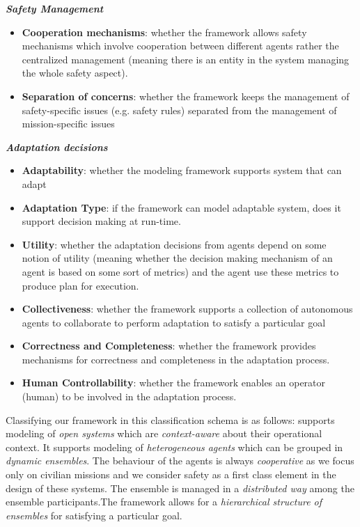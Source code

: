 \documentclass[journal]{IEEEtran}
\theoremstyle{definition}
\begin{document}
\textbf{\textit{Safety Management}}

\begin{itemize}
\item \textbf{Cooperation mechanisms}: whether the framework allows safety mechanisms which involve cooperation between different agents rather the centralized management (meaning there is an entity in the system managing the whole safety aspect).
\item \textbf{Separation of concerns}: whether the framework keeps the management of safety-specific issues (e.g. safety rules)  separated from the management of mission-specific issues
\end{itemize}

\textbf{\textit{Adaptation decisions}} 
\begin{itemize}
    

\item \textbf{Adaptability}: whether the modeling framework supports system that can adapt
\item 
\textbf{Adaptation Type}: if the framework can model adaptable system, does it support decision making at run-time. 
	\item 
\textbf{Utility}: whether the adaptation decisions from agents depend on some notion of utility (meaning whether the decision making mechanism of an agent is based on some sort of metrics) and the agent use these metrics to produce plan for execution. 
\item \textbf{Collectiveness}: whether the framework supports a collection of autonomous agents to collaborate to perform adaptation to satisfy a particular goal
\item \textbf{Correctness and Completeness}: whether the framework provides mechanisms for correctness and completeness in the adaptation process.
\item \textbf{Human Controllability}: whether the framework enables an operator (human) to be involved in the adaptation process. 
\end{itemize}



Classifying our framework in this classification schema is as follows:
supports modeling of \textit{open systems} which are \textit{context-aware} about their operational context. It supports modeling of \textit{heterogeneous agents} which can be grouped in \textit{dynamic ensembles}. The behaviour of the agents is always \textit{cooperative} as we focus only on civilian missions and we consider safety as a first class element in the design of these systems. The ensemble is managed in a \textit{distributed way} among the ensemble participants.The framework allows for a \textit{hierarchical structure of ensembles} for satisfying a particular goal.
\end{document}
